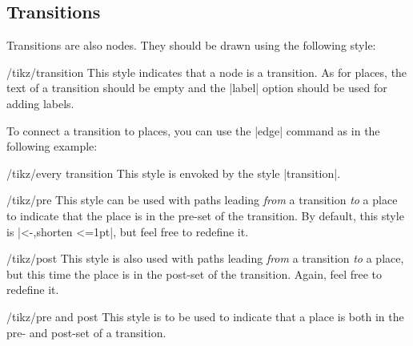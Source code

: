 \subsection{Transitions}

Transitions are also nodes. They should be drawn using the following
style: 

\begin{stylekey}{/tikz/transition}
  This style indicates that a node is a transition. As for places, the
  text of a transition should be empty and the |label| option should
  be used for adding labels.

  To connect a transition to places, you can use the |edge| command as
  in the following example:
  
\begin{codeexample}[]
\end{codeexample}
  
  \begin{stylekey}{/tikz/every transition}
    This style is envoked by the style |transition|.
  \end{stylekey}

  \begin{stylekey}{/tikz/pre}
    This style can be used with paths leading \emph{from} a transition
    \emph{to} a place to indicate that the place is in the pre-set of
    the transition. By default, this style is |<-,shorten <=1pt|, but
    feel free to redefine it.
  \end{stylekey}

  \begin{stylekey}{/tikz/post}
    This style is also used with paths leading \emph{from} a transition
    \emph{to} a place, but this time the place is in the post-set of
    the transition. Again, feel free to redefine it.
  \end{stylekey}

  \begin{stylekey}{/tikz/pre and post}
    This style is to be used to indicate that a place is both in the
    pre- and post-set of a transition.
  \end{stylekey}
\end{stylekey}


